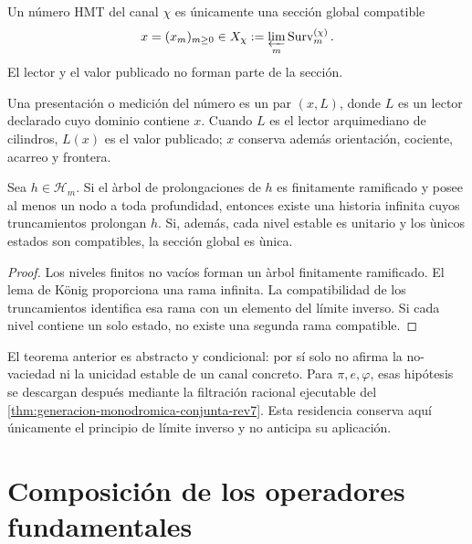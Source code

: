 \begin{definition}
\label{def:numero-hmt-tpk-completo}
Un n\'umero HMT del canal \(\chi\) es únicamente una secci\'on global
compatible
\[
 x=(x_m)_{m\geq0}\in
 X_\chi:=\varprojlim_m\operatorname{Surv}_m^{(\chi)}.
\]
El lector y el valor publicado no forman parte de la secci\'on.
\end{definition}

Una presentaci\'on o medici\'on del n\'umero es un par \((x,L)\), donde
\(L\) es un lector declarado cuyo dominio contiene \(x\). Cuando \(L\) es el
lector arquimediano de cilindros, \(L(x)\) es el valor publicado; \(x\)
conserva adem\'as orientaci\'on, cociente, acarreo y frontera.

\begin{theorem}
\label{thm:prolongacion-global-tpk-completo}
Sea \(h\in\mathcal H_m\). Si el \`arbol de prolongaciones de \(h\) es
finitamente ramificado y posee al menos un nodo a toda profundidad, entonces
existe una historia infinita cuyos truncamientos prolongan \(h\). Si, adem\'as,
cada nivel estable es unitario y los \`unicos estados son compatibles, la
secci\'on global es \`unica.
\end{theorem}
\begin{proof}
Los niveles finitos no vac\'ios forman un \`arbol finitamente ramificado. El
lema de K\"onig proporciona una rama infinita. La compatibilidad de los
truncamientos identifica esa rama con un elemento del l\'imite inverso. Si
cada nivel contiene un solo estado, no existe una segunda rama compatible.
\end{proof}

El teorema anterior es abstracto y condicional: por sí solo no afirma la
no-vaciedad ni la unicidad estable de un canal concreto. Para
\(\pi,e,\varphi\), esas hipótesis se descargan después mediante la filtración
racional ejecutable del
\cref{thm:generacion-monodromica-conjunta-rev7}. Esta residencia conserva
aquí únicamente el principio de límite inverso y no anticipa su aplicación.

\section{Composición de los operadores fundamentales}

